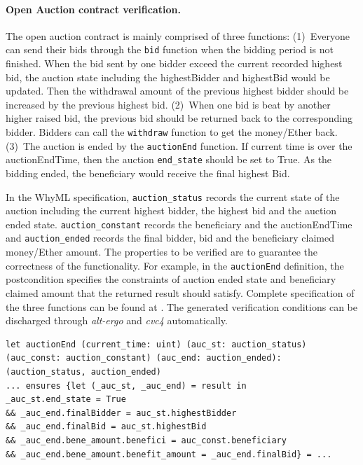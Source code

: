 \documentclass[runningheads]{llncs}
\begin{document}
\paragraph{Open Auction contract verification.}
The open auction contract is mainly comprised of three functions:
(1)~Everyone can send their bids through the \texttt{bid} function when the bidding period is not finished.
When the bid sent by one bidder exceed the current recorded highest bid, the auction state including the highestBidder and highestBid would be updated. Then the withdrawal amount of the previous
highest bidder should be increased by the previous highest bid.
(2)~When one bid is beat by another higher raised bid, the previous bid should be returned back to the
corresponding bidder. Bidders can call the \texttt{withdraw} function to get the money/Ether back.
(3)~The auction is ended by the \texttt{auctionEnd} function. If current time is over the auctionEndTime,
then the auction \texttt{end\_state} should be set to True. As the bidding ended, the beneficiary would 
receive the final highest Bid.

In the WhyML specification, \texttt{auction\_status} records the current state of the auction including the current 
highest bidder, the highest bid and the auction ended state. \texttt{auction\_constant} records the beneficiary and the
auctionEndTime and \texttt{auction\_ended} records the final bidder, bid and the beneficiary claimed money/Ether amount.
The properties to be verified are to guarantee the correctness of the functionality. For example,
in the \texttt{auctionEnd} definition, the postcondition specifies the constraints of 
auction ended state and beneficiary claimed amount that the returned result should satisfy.
Complete specification of the three functions can be found at \cite{Examples}.
The generated verification conditions can be discharged through \emph{alt-ergo} and \emph{cvc4} automatically.

\begin{verbatim}
let auctionEnd (current_time: uint) (auc_st: auction_status) 
(auc_const: auction_constant) (auc_end: auction_ended): 
(auction_status, auction_ended) 
... ensures {let (_auc_st, _auc_end) = result in 
_auc_st.end_state = True 
&& _auc_end.finalBidder = auc_st.highestBidder 
&& _auc_end.finalBid = auc_st.highestBid
&& _auc_end.bene_amount.benefici = auc_const.beneficiary 
&& _auc_end.bene_amount.benefit_amount = _auc_end.finalBid} = ...
\end{verbatim}
\end{document}
